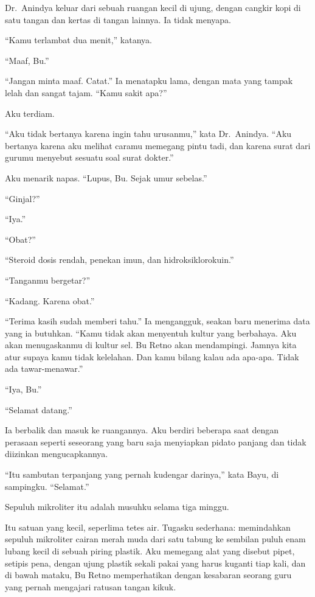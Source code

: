 \documentclass[11pt,twoside,openany]{book}
\makeatletter
\newcommand{\scenebreak}{\par\vspace{0.9em}{\centering\textsc{*\hspace{0.7em}*\hspace{0.7em}*}\par}\vspace{0.9em}\@afterindentfalse\@afterheading}
\makeatother
\begin{document}
Dr.~Anindya keluar dari sebuah ruangan kecil di ujung, dengan cangkir kopi di satu tangan dan kertas di tangan lainnya. Ia tidak menyapa.

``Kamu terlambat dua menit,'' katanya.

``Maaf, Bu.''

``Jangan minta maaf. Catat.'' Ia menatapku lama, dengan mata yang tampak lelah dan sangat tajam. ``Kamu sakit apa?''

Aku terdiam.

``Aku tidak bertanya karena ingin tahu urusanmu,'' kata Dr.~Anindya. ``Aku bertanya karena aku melihat caramu memegang pintu tadi, dan karena surat dari gurumu menyebut sesuatu soal surat dokter.''

Aku menarik napas. ``Lupus, Bu. Sejak umur sebelas.''

``Ginjal?''

``Iya.''

``Obat?''

``Steroid dosis rendah, penekan imun, dan hidroksiklorokuin.''

``Tanganmu bergetar?''

``Kadang. Karena obat.''

``Terima kasih sudah memberi tahu.'' Ia mengangguk, seakan baru menerima data yang ia butuhkan. ``Kamu tidak akan menyentuh kultur yang berbahaya. Aku akan menugaskanmu di kultur sel. Bu Retno akan mendampingi. Jamnya kita atur supaya kamu tidak kelelahan. Dan kamu bilang kalau ada apa-apa. Tidak ada tawar-menawar.''

``Iya, Bu.''

``Selamat datang.''

Ia berbalik dan masuk ke ruangannya. Aku berdiri beberapa saat dengan perasaan seperti seseorang yang baru saja menyiapkan pidato panjang dan tidak diizinkan mengucapkannya.

``Itu sambutan terpanjang yang pernah kudengar darinya,'' kata Bayu, di sampingku. ``Selamat.''

\scenebreak
Sepuluh mikroliter itu adalah musuhku selama tiga minggu.

Itu satuan yang kecil, seperlima tetes air. Tugasku sederhana: memindahkan sepuluh mikroliter cairan merah muda dari satu tabung ke sembilan puluh enam lubang kecil di sebuah piring plastik. Aku memegang alat yang disebut pipet, setipis pena, dengan ujung plastik sekali pakai yang harus kuganti tiap kali, dan di bawah mataku, Bu Retno memperhatikan dengan kesabaran seorang guru yang pernah mengajari ratusan tangan kikuk.
\end{document}
